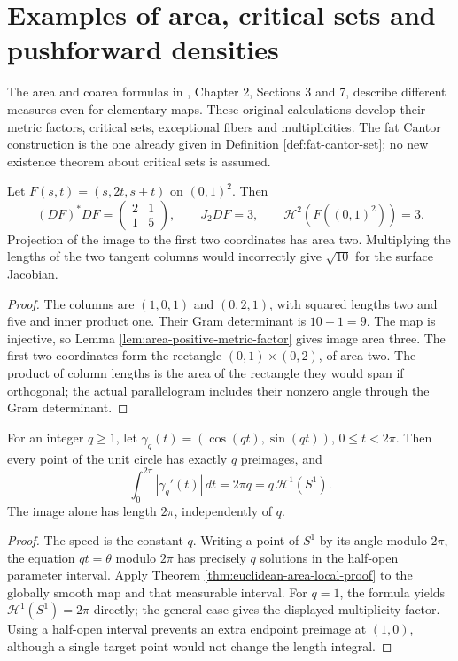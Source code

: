 \chapter{Examples of area, critical sets and pushforward densities}\label{sec:examples-area-critical}
The area and coarea formulas in \cite{Sim18}, Chapter 2, Sections 3 and 7, describe different measures even for elementary maps. These original calculations develop their metric factors, critical sets, exceptional fibers and multiplicities. The fat Cantor construction is the one already given in Definition \ref{def:fat-cantor-set}; no new existence theorem about critical sets is assumed.

\begin{example}\label{ex:area-nonorthogonal-linear-map}
Let $F(s,t)=(s,2t,s+t)$ on $(0,1)^2$. Then
\[
 (DF)^*DF=\begin{pmatrix}2&1\\1&5\end{pmatrix},
 \qquad J_2DF=3,
 \qquad \mathcal H^2(F((0,1)^2))=3.
\]
Projection of the image to the first two coordinates has area two. Multiplying the lengths of the two tangent columns would incorrectly give $\sqrt{10}$ for the surface Jacobian.
\end{example}
\begin{proof}
The columns are $(1,0,1)$ and $(0,2,1)$, with squared lengths two and five and inner product one. Their Gram determinant is $10-1=9$. The map is injective, so Lemma \ref{lem:area-positive-metric-factor} gives image area three. The first two coordinates form the rectangle $(0,1)\times(0,2)$, of area two. The product of column lengths is the area of the rectangle they would span if orthogonal; the actual parallelogram includes their nonzero angle through the Gram determinant.
\end{proof}

\begin{example}\label{ex:area-multiple-circle-traversal}
For an integer $q\geq1$, let $\gamma_q(t)=(\cos(qt),\sin(qt))$, $0\leq t<2\pi$. Then every point of the unit circle has exactly $q$ preimages, and
\[
 \int_0^{2\pi}|\gamma_q'(t)|\,dt=2\pi q
 =q\,\mathcal H^1(S^1).
\]
The image alone has length $2\pi$, independently of $q$.
\end{example}
\begin{proof}
The speed is the constant $q$. Writing a point of $S^1$ by its angle modulo $2\pi$, the equation $qt=\theta$ modulo $2\pi$ has precisely $q$ solutions in the half-open parameter interval. Apply Theorem \ref{thm:euclidean-area-local-proof} to the globally smooth map and that measurable interval. For $q=1$, the formula yields $\mathcal H^1(S^1)=2\pi$ directly; the general case gives the displayed multiplicity factor. Using a half-open interval prevents an extra endpoint preimage at $(1,0)$, although a single target point would not change the length integral.
\end{proof}

